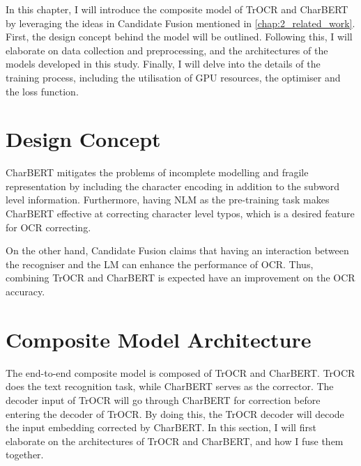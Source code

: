 \label{chap:3_method}
In this chapter, I will introduce the composite model of TrOCR and CharBERT by leveraging the ideas in Candidate Fusion mentioned in \autoref{chap:2_related_work}. First, the design concept behind the model will be outlined. Following this, I will elaborate on data collection and preprocessing, and the architectures of the models developed in this study. Finally, I will delve into the details of the training process, including the utilisation of GPU resources, the optimiser and the loss function.
\section{Design Concept}
\label{sec:3_design_concept}
CharBERT mitigates the problems of incomplete modelling and fragile representation by including the character encoding in addition to the subword level information. Furthermore, having NLM as the pre-training task makes CharBERT effective at correcting character level typos, which is a desired feature for OCR correcting. 

On the other hand, Candidate Fusion claims that having an interaction between the recogniser and the LM can enhance the performance of OCR. Thus, combining TrOCR and CharBERT is expected have an improvement on the OCR accuracy. 
\section{Composite Model Architecture}
\label{sec:3_composite_model_architecture}
The end-to-end composite model is composed of TrOCR and CharBERT. TrOCR does the text recognition task, while CharBERT serves as the corrector. The decoder input of TrOCR will go through CharBERT for correction before entering the decoder of TrOCR. By doing this, the TrOCR decoder will decode the input embedding corrected by CharBERT. In this section, I will first elaborate on the architectures of TrOCR and CharBERT, and how I fuse them together.

